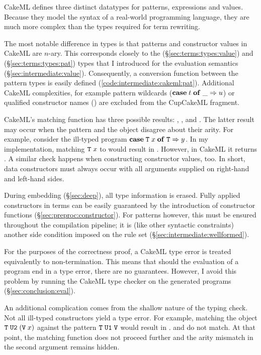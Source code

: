CakeML defines three distinct datatypes for patterns, expressions and values.
Because they model the syntax of a real-world programming language, they are much more complex than the types required for term rewriting.

The most notable difference in types is that patterns and constructor values in CakeML are $n$-ary.
This corresponds closely to the  (§\ref{sec:terms:types:value}) and  (§\ref{sec:terms:types:pat}) types that I introduced for the evaluation semantics (§\ref{sec:intermediate:value}).
Consequently, a conversion function between the pattern types is easily defined (\cref{code:intermediate:cakeml:pat}).
Additional CakeML complexities, for example pattern wildcards ($\mathtt{\mathbf{case}}\;t\;\mathtt{\mathbf{of}}\;\_ \Rightarrow u$) or qualified constructor names () are excluded from the CupCakeML fragment.

CakeML's matching function has three possible results: , , and .
The latter result may occur when the pattern and the object disagree about their arity.
For example, consider the ill-typed program $\mathtt{\mathbf{case}}\;\texttt{\textup{T}}\;x\;\mathtt{\mathbf{of}}\;\texttt{\textup{T}} \Rightarrow y$.
In my implementation, matching $\texttt{\textup{T}}\;x$ to  would result in .
However, in CakeML it returns .
A similar check happens when constructing constructor values, too.
In short, data constructors must always occur with all arguments supplied on right-hand and left-hand sides.

During embedding (§\ref{sec:deep}), all type information is erased.
Fully applied constructors in terms can be easily guaranteed by the introduction of constructor functions (§\ref{sec:preproc:constructor}).
For patterns however, this must be ensured throughout the compilation pipeline; it is (like other syntactic constraints) another side condition imposed on the rule set (§\ref{sec:intermediate:wellformed}).

For the purposes of the correctness proof, a CakeML type error is treated equivalently to non-termination.
This means that should the evaluation of a program end in a type error, there are no guarantees.
However, I avoid this problem by running the CakeML type checker on the generated programs (§\ref{sec:conclusion:eval}).

An additional complication comes from the shallow nature of the typing check.
Not all ill-typed constructors yield a type error.
For example, matching the object $\texttt{\textup{T}}\;\texttt{\textup{U2}}\;(\texttt{\textup{V}}\;x)$ against the pattern $\texttt{\textup{T}}\;\texttt{\textup{U1}}\;\texttt{\textup{V}}$ would result in .
 and  do not match.
At that point, the matching function does not proceed further and the arity mismatch in the second argument remains hidden.

